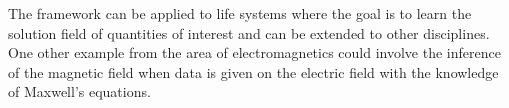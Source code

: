 \documentclass[book.tex]{subfiles}
\begin{document}
The framework can be applied to life systems where the goal is to learn the solution field of quantities of interest and can be extended to other disciplines. One other example from the area of electromagnetics could involve the inference of the magnetic field when data is given on the electric field with the knowledge of Maxwell’s equations.
\end{document}
